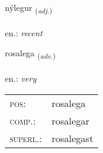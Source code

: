 \documentclass[frontgrid, backgrid]{flacards}\usepackage[]{graphicx}\usepackage[]{xcolor}
\begin{document}
\renewcommand{\flhead}{\vskip5pt \fboxsep=0pt {\small\bfseries\footnotesize Lýsingarorð | Adjective}}
\renewcommand{\fcfoot}{\vskip5pt \fboxsep=0pt \hspace{2pt}{\small\bfseries\footnotesize 2K}}

\renewcommand{\blhead}{\vskip5pt {\small\bfseries\footnotesize Lýsingarorð | Adjective }}
\renewcommand{\bcfoot}{\vskip5pt \hspace{2pt}{\small\bfseries\footnotesize 2K}}


{nýlegur \small{\textsubscript{(\textit{adj.})}} \\[1ex] %
\textphonetic{[niːlɛɣʏr]} \\
en.: \emph{recent} \\  [2ex]
\renewcommand*{\arraystretch}{0.8}
}

\renewcommand{\flhead}{\vskip5pt \fboxsep=0pt {\small\bfseries\footnotesize Atviksorð | Adverb}}
\renewcommand{\fcfoot}{\vskip5pt \fboxsep=0pt \hspace{2pt}{\small\bfseries\footnotesize 2K}}

\renewcommand{\blhead}{\vskip5pt {\small\bfseries\footnotesize Atviksorð | Adverb }}
\renewcommand{\bcfoot}{\vskip5pt \hspace{2pt}{\small\bfseries\footnotesize 2K}}


{rosalega \small{\textsubscript{(\textit{adv.})}} \\[1ex] %
\textphonetic{[rɔːsalɛɣa]} \\
en.: \emph{very} \\  [2ex]
\renewcommand*{\arraystretch}{0.8}
\begin{tabular}{ll}
\textsc{pos}: & rosalega \\ 
\textsc{comp.}: & rosalegar \\ 
\textsc{superl.}: & rosalegast \\
\end{tabular}
}
\end{document}
